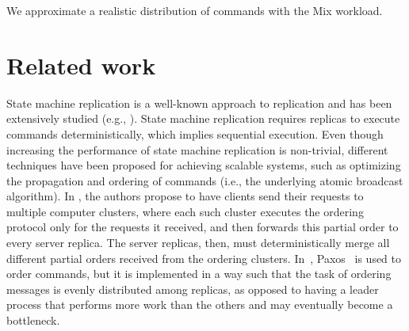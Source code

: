 \documentclass[11pt]{article}
\newcommand{\ssmr}{\mbox{S-SMR}}
\newcommand{\dssmr}{\mbox{DS-SMR}}
\begin{document}
We approximate a realistic distribution of commands with the Mix workload.


\label{sec:evaluation:result}


\section{Related work}

State machine replication is a well-known approach to replication and has been extensively studied (e.g., \cite{kapritsos2012eve, kotla2004htbft, Lam78, santos2013htsmr, Sch90}).
State machine replication requires replicas to execute commands deterministically, which implies sequential execution.
Even though increasing the performance of state machine replication is non-trivial, different techniques have been proposed for achieving scalable systems, such as optimizing the propagation and ordering of commands (i.e., the underlying atomic broadcast algorithm).
In \cite{kapritsos2010scalable}, the authors propose to have clients send their requests to multiple computer clusters, where each such cluster executes the ordering protocol only for the requests it received, and then forwards this partial order to every server replica.
The server replicas, then, must deterministically merge all different partial orders received from the ordering clusters.
In~\cite{biely2012spaxos}, Paxos~\cite{Lam98} is used to order commands, but it is implemented in a way such that the task of ordering messages is evenly distributed among replicas, as opposed to having a leader process that performs more work than the others and may eventually become a bottleneck. 
\end{document}

